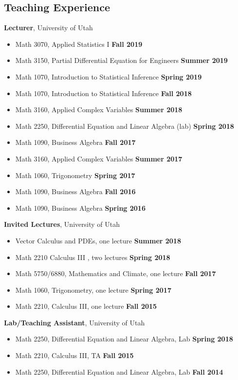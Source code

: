 \documentclass[margin,line]{res}
\begin{document}
\begin{resume}
\section{\sc Teaching Experience}
{\bf Lecturer}, University of Utah
\vspace*{.05in}
\begin{itemize}
\item[ ] Math 3070, Applied Statistics I \hfill {\bf Fall 2019}
\item[ ] Math 3150, Partial Differential Equation for Engineers \hfill {\bf Summer 2019}
\item[ ] Math 1070, Introduction to Statistical Inference \hfill {\bf Spring 2019}
\item[ ] Math 1070, Introduction to Statistical Inference \hfill {\bf Fall 2018}
\item[ ] Math 3160, Applied Complex Variables \hfill {\bf Summer 2018}
\item[ ] Math 2250, Differential Equation and Linear Algebra (lab) \hfill {\bf Spring 2018}
\item[ ] Math 1090, Business Algebra \hfill {\bf Fall 2017}
\item[ ] Math 3160, Applied Complex Variables \hfill {\bf Summer 2017}
\item[ ] Math 1060, Trigonometry \hfill {\bf Spring 2017}
\item[ ] Math 1090, Business Algebra \hfill {\bf Fall 2016}
\item[ ] Math 1090, Business Algebra \hfill {\bf Spring 2016}
\end{itemize}
{\bf Invited Lectures}, University of Utah
\vspace*{.05in}
\begin{itemize}
\item[ ] Vector Calculus and PDEs, one lecture \hfill {\bf Summer 2018}
\item[ ] Math 2210 Calculus III , two lectures \hfill {\bf Spring 2018}
\item[ ] Math 5750/6880, Mathematics and Climate, one lecture \hfill {\bf Fall 2017}
\item[ ] Math 1060, Trigonometry, one lecture \hfill {\bf Spring 2017}
\item[ ] Math 2210, Calculus III, one lecture \hfill {\bf Fall 2015}
\end{itemize}
{\bf Lab/Teaching Assistant}, University of Utah
\vspace*{.05in}
\begin{itemize}
\item[ ] Math 2250, Differential Equation and Linear Algebra, Lab \hfill {\bf Spring 2018}
\item[ ] Math 2210, Calculus III, TA \hfill {\bf Fall 2015}
\item[ ] Math 2250, Differential Equation and Linear Algebra, Lab \hfill {\bf Fall 2014}
\end{itemize}


\end{resume}
\end{document}
